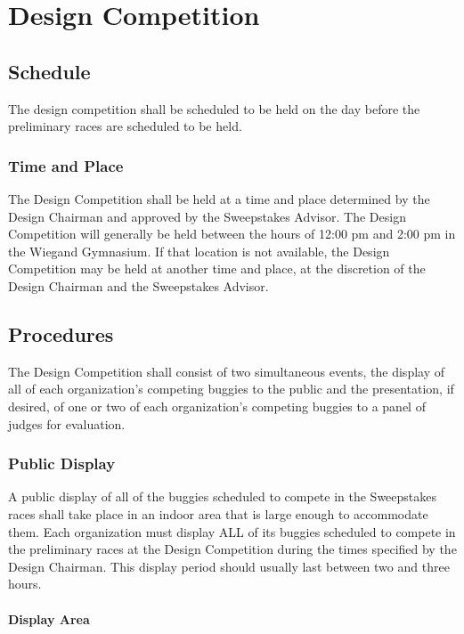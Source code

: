 \chapter{Design Competition}

\section{Schedule}

	The design competition shall be scheduled to be held on the day before the preliminary races are scheduled to be held.

\subsection{Time and Place}

	The Design Competition shall be held at a time and place determined by the Design Chairman and approved by the Sweepstakes Advisor. The Design Competition will generally be held between the hours of 12:00 pm and 2:00 pm in the Wiegand Gymnasium. If that location is not available, the Design Competition may be held at another time and place, at the discretion of the Design Chairman and the Sweepstakes Advisor.

\section{Procedures}

	The Design Competition shall consist of two simultaneous events, the display of all of each organization's competing buggies to the public and the presentation, if desired, of one or two of each organization's competing buggies to a panel of judges for evaluation.

\subsection{Public Display}

	A public display of all of the buggies scheduled to compete in the Sweepstakes races shall take place in an indoor area that is large enough to accommodate them. Each organization must display ALL of its buggies scheduled to compete in the preliminary races at the Design Competition during the times specified by the Design Chairman. This display period should usually last between two and three hours.

\subsubsection{Display Area}

